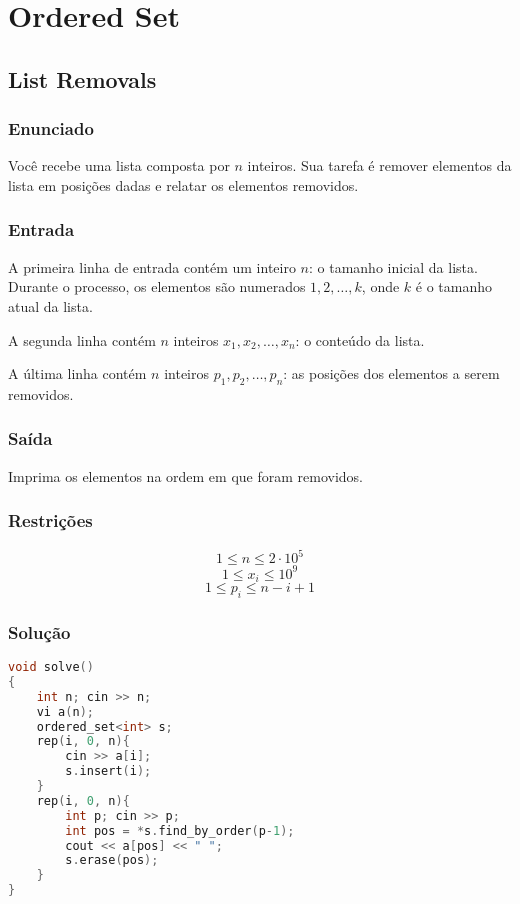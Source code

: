 \section{Ordered Set}
\subsection{List Removals}

\subsubsection*{Enunciado}
Você recebe uma lista composta por \( n \) inteiros. Sua tarefa é remover elementos da lista em posições dadas e relatar os elementos removidos.

\subsubsection*{Entrada}
A primeira linha de entrada contém um inteiro \( n \): o tamanho inicial da lista. Durante o processo, os elementos são numerados \( 1, 2, \dots, k \), onde \( k \) é o tamanho atual da lista.

A segunda linha contém \( n \) inteiros \( x_1, x_2, \dots, x_n \): o conteúdo da lista.

A última linha contém \( n \) inteiros \( p_1, p_2, \dots, p_n \): as posições dos elementos a serem removidos.

\subsubsection*{Saída}
Imprima os elementos na ordem em que foram removidos.

\subsubsection*{Restrições}
\[
1 \le n \le 2 \cdot 10^5
\]
\[
1 \le x_i \le 10^9
\]
\[
1 \le p_i \le n - i + 1
\]

\subsubsection*{Solução}
\begin{lstlisting}[language=C++]
void solve()
{
    int n; cin >> n;
    vi a(n);
    ordered_set<int> s;
    rep(i, 0, n){
        cin >> a[i];
        s.insert(i);
    }
    rep(i, 0, n){
        int p; cin >> p;
        int pos = *s.find_by_order(p-1);
        cout << a[pos] << " ";
        s.erase(pos);
    }
}
\end{lstlisting}


